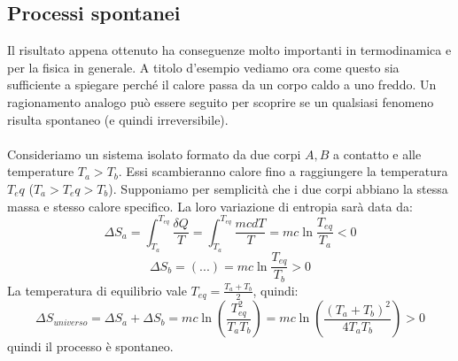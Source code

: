 \documentclass{article}
\begin{document}
\subsection{Processi spontanei}
Il risultato appena ottenuto ha conseguenze molto importanti in termodinamica e per la fisica in generale. A titolo d'esempio vediamo ora come questo sia sufficiente a spiegare perché il calore passa da un corpo caldo a uno freddo. Un ragionamento analogo può essere seguito per scoprire se un qualsiasi fenomeno risulta spontaneo (e quindi irreversibile).\\\\
Consideriamo un sistema isolato formato da due corpi $A,B$ a contatto e alle temperature $T_a>T_b$. Essi scambieranno calore fino a raggiungere la temperatura $T_eq$ ($T_a>T_eq>T_b$). Supponiamo per semplicità che i due corpi abbiano la stessa massa e stesso calore specifico. La loro variazione di entropia sarà data da:
$$ \Delta S_a =\int_{T_a}^{T_{eq}}\frac{\delta Q}{T}=\int_{T_a}^{T_{eq}}\frac{mcdT}{T}=mc\ln\frac{T_{eq}}{T_a}<0 $$
$$ \Delta S_b = (...) = mc\ln\frac{T_{eq}}{T_b}>0 $$
La temperatura di equilibrio vale $T_{eq}=\frac{T_a+T_b}{2}$, quindi:
$$ \Delta S_{universo} = \Delta S_a + \Delta S_b = mc \ln\left( \frac{T_{eq}^2}{T_aT_b} \right) = mc \ln\left( \frac{(T_a+T_b)^2}{4T_aT_b} \right) > 0 $$
quindi il processo è spontaneo.
\end{document}
